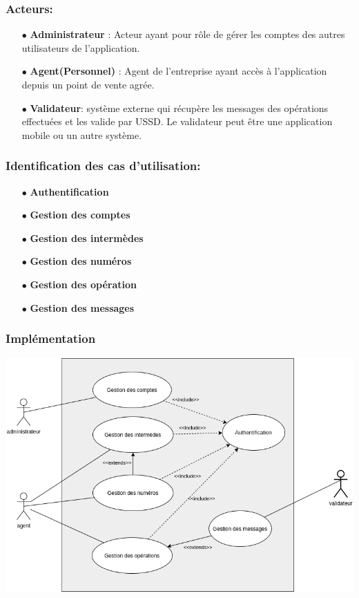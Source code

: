 		\subsubsection{Acteurs:}
			\begin{itemize}
				\item[$\bullet$] \textbf{Administrateur} : Acteur ayant pour rôle de gérer les comptes des autres utilisateurs de l'application.\\
				\item[$\bullet$]  \textbf{Agent(Personnel)} : Agent de l'entreprise ayant accès à l'application depuis un point de vente agrée.\\
				\item[$\bullet$] \textbf{Validateur}: système externe qui récupère les messages des opérations effectuées et les valide par USSD. Le validateur peut être une application mobile ou un autre système.\\
			\end{itemize}
		\subsubsection{Identification des cas d’utilisation:}
			\begin{itemize}
				\item[$\bullet$]  \textbf{Authentification}
				\item[$\bullet$] \textbf{Gestion des comptes}
				\item[$\bullet$] \textbf{Gestion des intermèdes}
				\item[$\bullet$] \textbf{Gestion des numéros}
				\item[$\bullet$] \textbf{Gestion des opération}
				\item[$\bullet$] \textbf{Gestion des messages}
			\end{itemize}
		\subsubsection{Implémentation}
			\begin{center}
				\includegraphics[width=16cm]{chap_2/use-case.png}\cite{}
				\label{figure9}
			\end{center}

